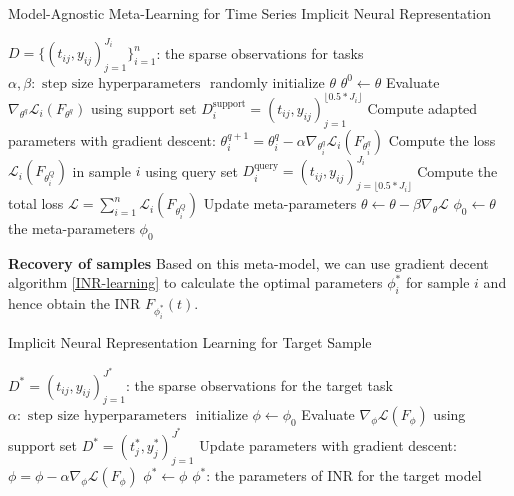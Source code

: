 \documentclass{article}
\begin{document}
\begin{algorithm}[htb]
	\renewcommand{\algorithmicrequire}{\textbf{Input:}}
	\renewcommand{\algorithmicensure}{\textbf{Output:}}
	\caption{Model-Agnostic Meta-Learning for Time Series Implicit Neural Representation}
	\label{MAML}
	\begin{algorithmic}
    \REQUIRE $D=\{(t_{ij},y_{ij})_{j=1}^{J_i}\}_{i=1}^n$: the sparse observations for tasks
    \REQUIRE $\alpha, \beta: \text { step size hyperparameters }$
		\STATE randomly initialize $\theta$
        \STATE $\theta^0 \gets \theta$
          \STATE Evaluate $\nabla_{\theta^q} \mathcal{L}_{i}\left(F_{\theta^q}\right)$ using support set $D_i^{\text{support}}=(t_{ij},y_{ij})_{j=1}^{\lfloor 0.5*J_i\rfloor }$
          \STATE Compute adapted parameters with gradient descent:
          $\theta_i^{q+1}=\theta_i^q-\alpha \nabla_{\theta_i^q} \mathcal{L}_{i}\left(F_{\theta_i^q}\right)$
        \ENDFOR
        \STATE Compute the loss $\mathcal{L}_{i}\left(F_{\theta_i^Q}\right)$ in sample $i$ using query set $D_i^{\text{query}}=(t_{ij},y_{ij})_{j=\lfloor 0.5*J_i\rfloor }^{J_i}$
      \ENDFOR
      \STATE Compute the total loss $\mathcal{L} = \sum_{i=1}^n \mathcal{L}_{i}\left(F_{\theta_i^Q}\right)$
      \STATE Update meta-parameters $\theta \leftarrow \theta-\beta \nabla_\theta \mathcal{L} $
    \ENDWHILE 
    \STATE $\phi_0 \gets \theta$
		\ENSURE the meta-parameters $\phi_0$
  \end{algorithmic}  
\end{algorithm}


\textbf{Recovery of samples}
Based on this meta-model, we can use gradient decent algorithm \ref{INR-learning} to calculate the optimal parameters $\phi^*_i$ for sample $i$ and hence obtain the INR $F_{\phi^*_i}(t)$. 
\begin{algorithm}[htb]
	\renewcommand{\algorithmicrequire}{\textbf{Input:}}
	\renewcommand{\algorithmicensure}{\textbf{Output:}}
	\caption{Implicit Neural Representation Learning for Target Sample}
	\label{INR-learning}
	\begin{algorithmic}
    \REQUIRE $D^*=(t_{ij},y_{ij})_{j=1}^{J^*}$: the sparse observations for the target task
    \REQUIRE $\alpha: \text { step size hyperparameters }$
		\STATE initialize $\phi \gets \phi_0$
      \STATE Evaluate $\nabla_{\phi} \mathcal{L}\left(F_{\phi}\right)$ using support set $D^*=(t_{j}^*,y_{j}^*)_{j=1}^{J^*}$
      \STATE Update parameters with gradient descent:
      $\phi=\phi-\alpha \nabla_{\phi} \mathcal{L}\left(F_{\phi}\right)$
    \ENDWHILE 
    \STATE $\phi^* \gets \phi$
		\ENSURE $\phi^*$: the parameters of INR for the target model 
  \end{algorithmic}  
\end{algorithm}
\end{document}
